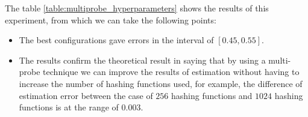 The table \ref{table:multiprobe_hyperparameters} shows the results of this
experiment, from which we can take the following points:
\begin{itemize}
    \item The best configurations gave errors in the interval of $[0.45, 0.55]$.
    \item The results confirm the theoretical result in
          \citep{andoni_practicalsh_2015} saying that by using a multi-probe
          technique we can improve the results of estimation without having to
          increase the number of hashing functions used, for example, the
          difference of estimation error between the case of $256$ hashing
          functions and $1024$ hashing functions is at the range of $0.003$.
\end{itemize}


